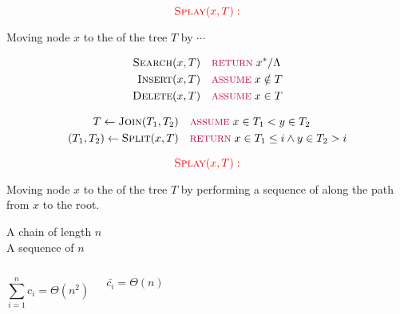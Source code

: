 \begin{frame}{}
  \begin{center}
    \[
      \textcolor{red}{\textsc{Splay}(x, T):}
    \]

    Moving node $x$ to the  of the tree $T$ by $\cdots$
  \end{center}

  \pause
  \vspace{-0.50cm}
  \begin{align*}
    \textsc{Search}(x, T) & \quad \textcolor{purple}{\text{\footnotesize RETURN }} x^{\ast}/\Lambda \\
    \textsc{Insert}(x, T) & \quad \textcolor{purple}{\text{\footnotesize ASSUME }} x \notin T \\
    \textsc{Delete}(x, T) & \quad \textcolor{purple}{\text{\footnotesize ASSUME }} x \in T \\
  \end{align*}

  \pause
  \vspace{-0.80cm}
  \begin{align*}
    T \gets \textsc{Join}(T_1, T_2) & \quad \textcolor{purple}{\text{\footnotesize ASSUME }} x \in T_1 < y \in T_2 \\
    (T_1, T_2) \gets \textsc{Split}(x, T) & \quad \textcolor{purple}{\text{\footnotesize RETURN }} x \in T_1 \le i \land y \in T_2 > i
  \end{align*}
\end{frame}

\begin{frame}{}
  \begin{center}
    \[
      \textcolor{red}{\textsc{Splay}(x, T):}
    \]

    Moving node $x$ to the  of the tree $T$ by performing a sequence of 
    along the path from $x$ to the root.
  \end{center}

  \pause
\end{frame}

\begin{frame}{}
  \begin{center}
    A chain of length $n$ \\[8pt]
    A sequence of $n$ \splay{}
  \end{center}

  \begin{columns}
      \pause
      \[
	\sum_{i = 1}^{n} c_i = \Theta(n^2)
      \]

      \[
	\bar{c_i} = \Theta(n)
      \]
  \end{columns}
\end{frame}

